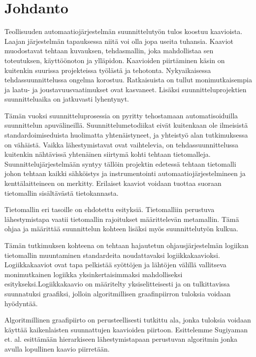 \documentclass[finnish,12pt]{article}
\begin{document}
	\cleardoublepage
	\storeinipagenumber
	\setcounter{page}{1}

	\section{Johdanto}
	\thispagestyle{empty}

Teollisuuden automaatiojärjestelmän suunnittelutyön tulos koostuu kaavioista. Laajan järjestelmän tapauksessa niitä voi olla jopa useita tuhansia. Kaaviot muodostavat tehtaan kuvauksen, tehdasmallin, joka mahdollistaa sen toteutuksen, käyttöönoton ja ylläpidon. Kaavioiden piirtäminen käsin on kuitenkin suurissa projekteissa työlästä ja tehotonta. Nykyaikaisessa tehdassuunnittelussa ongelma korostuu. Ratkaisuista on tullut monimutkaisempia ja laatu- ja joustavuusvaatimukset ovat kasvaneet. Lisäksi suunnitteluprojektien suunnitteluaika on jatkuvasti lyhentynyt.

Tämän vuoksi suunnitteluprosessia on pyritty tehostamaan automatisoiduilla suunnittelun apuvälineillä. Suunnittelumetodiikat eivät kuitenkaan ole ilmeisistä standardoimiseduista huolimatta yhtenäistyneet, ja yhteistyö alan tutkimuksessa on vähäistä. Vaikka lähestymistavat ovat vaihtelevia, on tehdassuunnittelussa kuitenkin nähtävissä yhtenäinen siirtymä kohti tehtaan tietomalleja. Suunnittelujärjestelmään syntyy tällöin projektin edetessä tehtaan tietomalli johon tehtaan kaikki sähköistys ja instrumentointi automaatiojärjestelmineen ja kenttälaitteineen on merkitty. Erilaiset kaaviot voidaan tuottaa suoraan tietomallin sisältävästä tietokannasta.

Tietomallin eri tasoille on ehdotettu esityksiä. Tietomalliin perustuva lähestymistapa vaatii tietomallin rajoitukset määrittelevän metamallin. Tämä ohjaa ja määrittää suunnittelun kohteen lisäksi myös suunnittelutyön kulkua.

Tämän tutkimuksen kohteena on tehtaan hajautetun ohjausjärjestelmän logiikan tietomallin muuntaminen standardeita noudattavaksi logiikkakaavioksi. Logiikkakaaviot ovat tapa pelkistää syöttöjen ja lähtöjen välillä vallitseva monimutkainen logiikka yksinkertaisimmaksi mahdolliseksi esitykseksi.Logiikkakaavio on määritelty yksiselitteisesti ja on tulkittavissa suunnatuksi graafiksi, jolloin algoritmillisen graafinpiirron tuloksia voidaan hyödyntää.

Algoritmillinen graafipiirto on perusteellisesti tutkittu ala, jonka tuloksia voidaan käyttää kaikenlaisten suunnattujen kaavioiden piirtoon. Esittelemme Sugiyaman et. al. \cite{RefWorks:9} esittämään hierarkiseen lähestymistapaan perustuvan algoritmin jonka avulla lopullinen kaavio piirretään.
\end{document}
